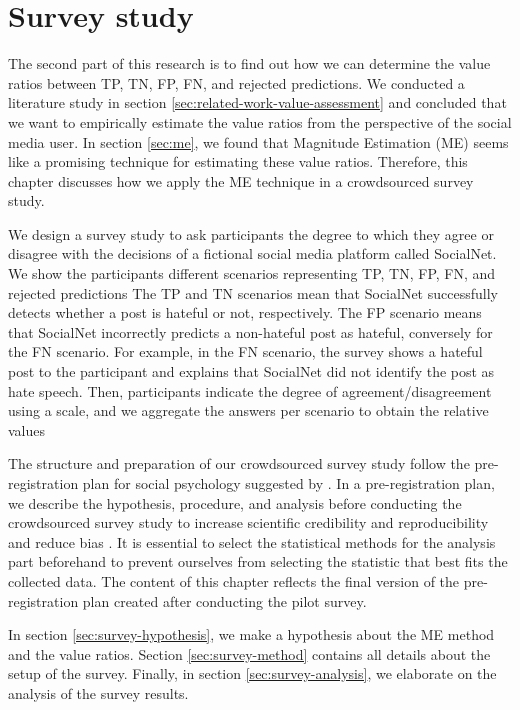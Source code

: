 \chapter{Survey study}
\label{sec:survey}
The second part of this research is to find out how we can determine the value ratios between TP, TN, FP, FN, and rejected predictions.
%
We conducted a literature study in section \ref{sec:related-work-value-assessment} and concluded that we want to empirically  estimate the value ratios from the perspective of the social media user.
%
In section \ref{sec:me}, we found that Magnitude Estimation (ME) seems like a promising technique for estimating these value ratios.
%
Therefore, this chapter discusses how we apply the ME technique in a crowdsourced survey study.
%

%
We design a survey study to ask participants the degree to which they agree or disagree with the decisions of a fictional social media platform called SocialNet.
%
We show the participants different scenarios representing TP, TN, FP, FN, and rejected predictions
%
The TP and TN scenarios mean that SocialNet successfully detects whether a post is hateful or not, respectively.
%
The FP scenario means that SocialNet incorrectly predicts a non-hateful post as hateful, conversely for the FN scenario.
%
For example, in the FN scenario, the survey shows a hateful post to the participant and explains that SocialNet did not identify the post as hate speech.
%
Then, participants indicate the degree of agreement/disagreement using a scale, and we aggregate the answers per scenario to obtain the relative values
%

%
The structure and preparation of our crowdsourced survey study follow the pre-registration plan for social psychology suggested by \citet{van2016pre}.
%
In a pre-registration plan, we describe the hypothesis, procedure, and analysis before conducting the crowdsourced survey study to increase scientific credibility and reproducibility and reduce bias \citep{van2016pre}.
%
It is essential to select the statistical methods for the analysis part beforehand to prevent ourselves from selecting the statistic that best fits the collected data.
%
The content of this chapter reflects the final version of the pre-registration plan created after conducting the pilot survey.
%

%
In section \ref{sec:survey-hypothesis}, we make a hypothesis about the ME method and the value ratios.
%
Section \ref{sec:survey-method} contains all details about the setup of the survey.
%
Finally, in section \ref{sec:survey-analysis}, we elaborate on the analysis of the survey results.

